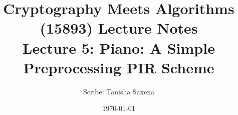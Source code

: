 \documentclass[11pt]{article}
\title{{\Large Cryptography Meets Algorithms (15893) Lecture Notes}\\[5pt]
{\bf Lecture 5: Piano: A Simple Preprocessing PIR Scheme}}
\author{Scribe: Tanisha Saxena}
\date{\today}
\begin{document}
\maketitle


{

}


\end{document}
